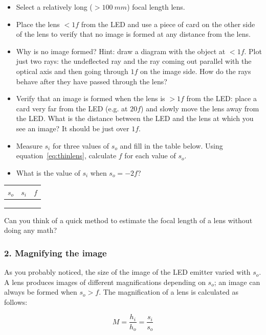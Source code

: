 \documentclass[a4paper]{report}
\begin{document}
\begin{itemize}
\item Select a relatively long ($>100~mm$) focal length lens.
\item Place the lens $<1f$ from the LED and use a piece of card on the other side of the lens to verify that no image is formed at any distance from the lens.
\item Why is no image formed? 
Hint: draw a diagram with the object at $<1f$. Plot just two rays: the undeflected ray and the ray coming out parallel with the optical axis and then going through $1f$ on the image side. 
How do the rays behave after they have passed through the lens?
\item Verify that an image is formed when the lens is $>1f$ from the LED: place a card very far from the LED (e.g. at $20f$) and slowly move the lens away from the LED. 
What is the distance between the LED and the lens at which you see an image? 
It should be just over $1f$.
\item Measure $s_i$ for three values of $s_o$ and fill in the table below. 
Using equation~\ref{eq:thinlens}, calculate $f$ for each value of $s_o$.
\item What is the value of $s_i$ when $s_o=-2f$?
\end{itemize}

\vspace{2em}
\begin{tabular}{| p{1cm} | p{1cm} | p{1cm} |}
\hline
 $s_o$  &  $s_i$  &  $f$  \\
\hline
\hline
 & & \\ \hline
 & & \\ \hline
 & & \\ \hline
\end{tabular}

\vspace{2em}
Can you think of a quick method to estimate the focal length of a lens without doing any math? 

\subsubsection{2. Magnifying the image}
As you probably noticed, the size of the image of the LED emitter varied with $s_o$.
A lens produces images of different magnifications depending on $s_o$; an image can always be formed when $s_o>f$. 
The magnification of a lens is calculated as follows:

\begin{equation}
M = \frac{h_i}{h_o} = \frac{s_i}{s_o}
\label{eq:mag}
\end{equation}
\end{document}

